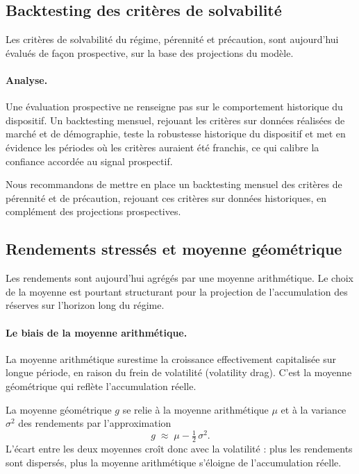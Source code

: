 \documentclass[11pt,a4paper]{article}
\begin{document}
\subsection{Backtesting des critères de solvabilité}

Les critères de solvabilité du régime, pérennité et précaution, sont aujourd'hui évalués de façon prospective, sur la base des projections du modèle.

\paragraph{Analyse.} Une évaluation prospective ne renseigne pas sur le comportement historique du dispositif. Un backtesting mensuel, rejouant les critères sur données réalisées de marché et de démographie, teste la robustesse historique du dispositif et met en évidence les périodes où les critères auraient été franchis, ce qui calibre la confiance accordée au signal prospectif.

\begin{insightbox}
Nous recommandons de mettre en place un backtesting mensuel des critères de pérennité et de précaution, rejouant ces critères sur données historiques, en complément des projections prospectives.
\end{insightbox}

\subsection{Rendements stressés et moyenne géométrique}

Les rendements sont aujourd'hui agrégés par une moyenne arithmétique. Le choix de la moyenne est pourtant structurant pour la projection de l'accumulation des réserves sur l'horizon long du régime.

\paragraph{Le biais de la moyenne arithmétique.} La moyenne arithmétique surestime la croissance effectivement capitalisée sur longue période, en raison du frein de volatilité (volatility drag). C'est la moyenne géométrique qui reflète l'accumulation réelle.

\begin{definitionbox}
La moyenne géométrique $g$ se relie à la moyenne arithmétique $\mu$ et à la variance $\sigma^2$ des rendements par l'approximation
\[
g \;\approx\; \mu - \tfrac{1}{2}\,\sigma^2 .
\]
L'écart entre les deux moyennes croît donc avec la volatilité : plus les rendements sont dispersés, plus la moyenne arithmétique s'éloigne de l'accumulation réelle.
\end{definitionbox}
\end{document}
